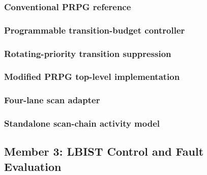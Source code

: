 \subsubsection{Conventional PRPG reference}
\leavevmode\par


\subsubsection{Programmable transition-budget controller}
\leavevmode\par


\subsubsection{Rotating-priority transition suppression}
\leavevmode\par


\subsubsection{Modified PRPG top-level implementation}
\leavevmode\par


\subsubsection{Four-lane scan adapter}
\leavevmode\par


\subsubsection{Standalone scan-chain activity model}
\leavevmode\par


\subsection{Member 3: LBIST Control and Fault Evaluation}
